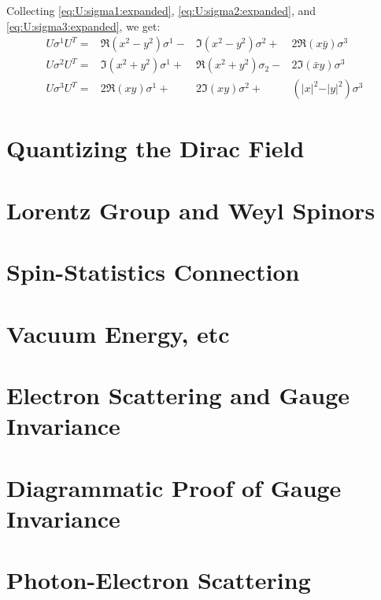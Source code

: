 \documentclass[]{article}
\begin{document}
Collecting \eqref{eq:U:sigma1:expanded}, \eqref{eq:U:sigma2:expanded}, and \eqref{eq:U:sigma3:expanded}, we get:
\begin{equation}
	\begin{aligned}
		U \sigma^1 U^T  =& \Re{(x^2-y^2)} \sigma^1 -& \Im{(x^2-y^2)} \sigma^2 +& 2 \Re({x\bar{y}}) \sigma^3\\
		U \sigma^2 U^T  =& \Im(x^2 + y^2) \sigma^1 +& \Re(x^2+y^2) \sigma_2 -& 2 \Im({\bar{x}y}) \sigma^3  \\
		U \sigma^3 U^T =&  2 \Re(xy) \sigma^1 +& 2 \Im(xy) \sigma^2 +& (\vert x \vert^2 - \vert y \vert^2) \sigma^3
	\end{aligned}\label{eq:all3sigma}
\end{equation}

\section{Quantizing the Dirac Field}
\section{Lorentz Group and Weyl Spinors}
\section{Spin-Statistics Connection}
\section{Vacuum Energy, etc}
\section{Electron Scattering and Gauge Invariance}
\section{Diagrammatic Proof of Gauge Invariance}
\section{Photon-Electron Scattering}


\raggedright

\end{document}
